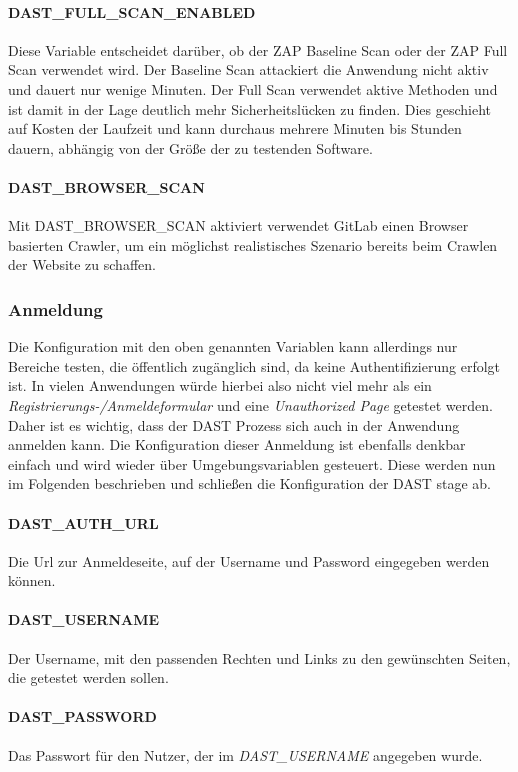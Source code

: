 \paragraph{DAST\_FULL\_SCAN\_ENABLED} Diese Variable entscheidet darüber, ob der ZAP Baseline Scan\cite{OWASPZAPBaseline} oder der ZAP Full Scan\cite{OWASPZAPFull} verwendet wird.
Der Baseline Scan attackiert die Anwendung nicht aktiv und dauert nur wenige Minuten.
Der Full Scan verwendet aktive Methoden und ist damit in der Lage deutlich mehr Sicherheitslücken zu finden.
Dies geschieht auf Kosten der Laufzeit und kann durchaus mehrere Minuten bis Stunden dauern, abhängig von der Größe der zu testenden Software.
\paragraph{DAST\_BROWSER\_SCAN} Mit DAST\_BROWSER\_SCAN aktiviert verwendet GitLab einen Browser basierten Crawler, um ein möglichst realistisches Szenario bereits beim Crawlen der Website zu schaffen.

\subsubsection{Anmeldung}

Die Konfiguration mit den oben genannten Variablen kann allerdings nur Bereiche testen, die öffentlich zugänglich sind, da keine Authentifizierung erfolgt ist.
In vielen Anwendungen würde hierbei also nicht viel mehr als ein \textit{Registrierungs-/Anmeldeformular} und eine \textit{Unauthorized Page} getestet werden.
Daher ist es wichtig, dass der DAST Prozess sich auch in der Anwendung anmelden kann.
Die Konfiguration dieser Anmeldung ist ebenfalls denkbar einfach und wird wieder über Umgebungsvariablen gesteuert.
Diese werden nun im Folgenden beschrieben und schließen die Konfiguration der DAST stage ab.

\paragraph{DAST\_AUTH\_URL}
Die Url zur Anmeldeseite, auf der Username und Password eingegeben werden können.
\paragraph{DAST\_USERNAME}
Der Username, mit den passenden Rechten und Links zu den gewünschten Seiten, die getestet werden sollen.
\paragraph{DAST\_PASSWORD}
Das Passwort für den Nutzer, der im \textit{DAST\_USERNAME} angegeben wurde.
